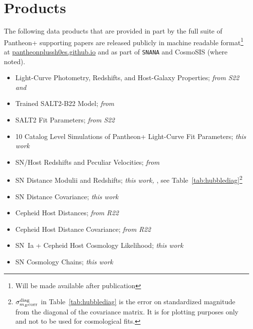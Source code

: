 \documentclass[twocolumn]{aastex63}
\begin{document}



\section{Products}
\label{appendix:dr}


The following data products {that are provided in part by the full suite of Pantheon+ supporting papers} are released publicly in machine readable format\footnote{{Will be made available after publication}} at \href{pantheonplussh0es.github.io}{pantheonplussh0es.github.io} and as part of \texttt{SNANA} and CosmoSIS (where noted).

\begin{itemize}
 
\item Light-Curve Photometry, Redshifts, and Host-Galaxy Properties; \textit{from S22 and \cite{carr21}}
\item {Trained SALT2-B22 Model; \textit{from \cite{fragilistic}}}
\item SALT2 Fit Parameters; \textit{from S22}
\item 10 Catalog Level Simulations of Pantheon+ Light-Curve Fit Parameters; \textit{this work}
\item SN/Host Redshifts and Peculiar Velocities; \textit{from} \cite{carr21}
\item SN Distance Modulii and Redshifts; \textit{this work, \cite{carr21}}, see Table~\ref{tab:hubblediag}\footnote{$\sigma_{m_B{\rm corr}}^{\rm diag}$ in Table~\ref{tab:hubblediag} is the error on standardized magnitude from the diagonal of the covariance matrix. It is for plotting purposes only and not to be used for cosmological fits.}
\item SN Distance Covariance; \textit{this work}
\item Cepheid Host Distances; \textit{from R22}
\item Cepheid Host Distance Covariance; \textit{from R22}
\item SN~Ia + Cepheid Host Cosmology Likelihood; \textit{this work}
\item SN Cosmology Chains; \textit{this work}

\end{itemize}

\newpage
\newpage

\end{document}
